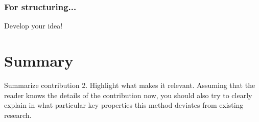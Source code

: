 \subsubsection{For structuring...}
Develop your idea!






\section{Summary}
\label{s:Contribution-2-Summary}

Summarize contribution 2. Highlight what makes it relevant. Assuming that the reader knows the details of the contribution now, you should also try to clearly explain in what particular key properties this method deviates from existing research.
